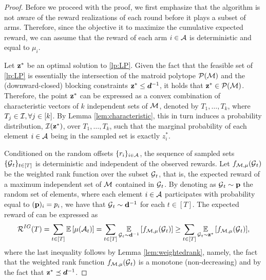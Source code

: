 \begin{proof}
Before we proceed with the proof, we first emphasize that the algorithm \IG is not aware of the reward realizations of each round before it plays a subset of arms. Therefore, since the objective it to maximize the cumulative expected reward, we can assume that the reward of each arm $i \in \operatorname{\mathcal{A}}$ is deterministic and equal to $\mu_i$.

Let $\operatorname{\mathbf{z}}^*$ be an optimal solution to \eqref{lp:LP}. Given the fact that the feasible set of \eqref{lp:LP} is essentially the intersection of the matroid polytope $\mathcal{P}(\operatorname{\mathcal{M}})$ and the (downward-closed) blocking constraints $\operatorname{\mathbf{z}}^* \leq \bm{d}^{-1}$, it holds that $\operatorname{\mathbf{z}}^* \in \mathcal{P}(\operatorname{\mathcal{M}})$. Therefore, the point $\operatorname{\mathbf{z}}^*$ can be expressed as a convex combination of characteristic vectors of $k$ independent sets of $\operatorname{\mathcal{M}}$, denoted by $T_1, \dots, T_k $, where $T_j \in \operatorname{\mathcal{I}}, \forall j \in [k]$. By Lemma \ref{lem:characteristic}, this in turn induces a probability distribution, $\operatorname{\mathcal{I}}(\operatorname{\mathbf{z}}^*)$, over $T_1, \dots, T_k$, such that the marginal probability of each element $i \in \operatorname{\mathcal{A}}$ being in the sampled set is exactly $z^*_i$.

Conditioned on the random offsets $\{r_i\}_{i \in \operatorname{\mathcal{A}}}$, the sequence of sampled sets $\{\operatorname{\mathcal{G}}_t\}_{t \in [T]}$ is deterministic and independent of the observed rewards. Let $f_{\operatorname{\mathcal{M}},\mu}(\operatorname{\mathcal{G}}_t)$ be the weighted rank function over the subset $\operatorname{\mathcal{G}}_t$, that is, the expected reward of a maximum independent set of $\operatorname{\mathcal{M}}$ contained in $\operatorname{\mathcal{G}}_t$. By denoting as $\operatorname{\mathcal{G}}_t \sim {\bf p}$ the random set of elements, where each element $i \in \operatorname{\mathcal{A}}$ participates with probability equal to $({\bf p})_i = p_i$, we have that $\operatorname{\mathcal{G}}_t \sim {\bf d}^{-1}$ for each $t \in [T]$. The expected reward of \IG can be expressed as
\begin{align*}
    \operatorname{\mathcal{R}}^{IG}(T) = \sum_{t \in [T]} \mathop{\mathbb{E}\left[\mu(\operatorname{\mathcal{A}}_t)\right]} = \sum_{t \in [T]} \mathop{\underset{\operatorname{\mathcal{G}}_t \sim {\bf d}^{-1}}{\mathbb{E}}\left[f_{\operatorname{\mathcal{M}},\mu}(\operatorname{\mathcal{G}}_t)\right]} \geq  \sum_{t \in [T]} \mathop{\underset{\operatorname{\mathcal{G}}_t \sim \operatorname{\mathbf{z}}^*}{\mathbb{E}}\left[f_{\operatorname{\mathcal{M}},\mu}(\operatorname{\mathcal{G}}_t)\right]},
\end{align*}
where the last inequality follows by Lemma \ref{lem:weightedrank}, namely, the fact that the weighted rank function $f_{\operatorname{\mathcal{M}},\mu}(\operatorname{\mathcal{G}}_t)$ is a monotone (non-decreasing) and by the fact that $\operatorname{\mathbf{z}}^* \preceq \bm{d}^{-1}$.


\end{proof}
